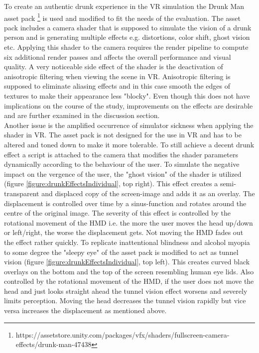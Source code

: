 To create an authentic drunk experience in the VR simulation the Drunk Man asset pack \footnote{https://assetstore.unity.com/packages/vfx/shaders/fullscreen-camera-effects/drunk-man-47438} is used and modified to fit the needs of the evaluation.
The asset pack includes a camera shader that is supposed to simulate the vision of a drunk person and is generating multiple effects e.g. distortions, color shift, ghost vision etc.
Applying this shader to the camera requires the render pipeline to compute six additional render passes and affects the overall performance and visual quality.
A very noticeable side effect of the shader is the deactivation of anisotropic filtering when viewing the scene in VR.
Anisotropic filtering is supposed to eliminate aliasing effects \autocite{blinn1976texture} and in this case smooth the edges of textures to make their appearance less "blocky".
Even though this does not have implications on the course of the study, improvements on the effects are desirable and are further examined in the discussion section.
\\
Another issue is the amplified occurrence of simulator sickness when applying the shader in VR.
The asset pack is not designed for the use in VR and has to be altered and toned down to make it more tolerable.
To still achieve a decent drunk effect a script is attached to the camera that modifies the shader parameters dynamically according to the behaviour of the user.
To simulate the negative impact on the vergence of the user, the "ghost vision" of the shader is utilized (figure \ref{figure:drunkEffectsIndividual}, top right).
This effect creates a semi-transparent and displaced copy of the screen-image and adds it as an overlay. 
The displacement is controlled over time by a sinus-function and rotates around the centre of the original image.
The severity of this effect is controlled by the rotational movement of the HMD i.e. the more the user moves the head up/down or left/right, the worse the displacement gets.
Not moving the HMD fades out the effect rather quickly. 
To replicate inattentional blindness and alcohol myopia to some degree the "sleepy eye" of the asset pack is modified to act as tunnel vision (figure \ref{figure:drunkEffectsIndividual}, top left).
This creates curved black overlays on the bottom and the top of the screen resembling human eye lids.
Also controlled by the rotational movement of the HMD, if the user does not move the head and just looks straight ahead the tunnel vision effect worsens and severely limits perception.
Moving the head decreases the tunnel vision rapidly but vice versa increases the displacement as mentioned above.
